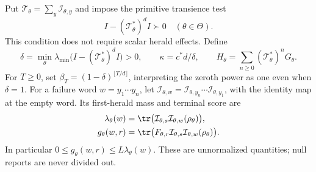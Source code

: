 Put $\mathcal T_\theta=\sum_y\mathcal I_{\theta,y}$ and impose the primitive transience test
\begin{equation}\label{eq:r67-transience}
 I-(\mathcal T_\theta^*)^dI\succ0\quad(\theta\in\Theta).
\end{equation}
This condition does not require scalar herald effects. Define
\[
 \delta=\min_\theta\lambda_{\min}\bigl(I-(\mathcal T_\theta^*)^dI\bigr)>0,
 \qquad \kappa=c^*d/\delta,
 \qquad H_\theta=\sum_{n\ge0}(\mathcal T_\theta^*)^nG_\theta.
\]
For $T\ge0$, set $\beta_T=(1-\delta)^{\lfloor T/d\rfloor}$, interpreting the zeroth power as one even when $\delta=1$. For a failure word $w=y_1\cdots y_n$, let $\mathcal I_{\theta,w}=\mathcal I_{\theta,y_n}\cdots\mathcal I_{\theta,y_1}$, with the identity map at the empty word. Its first-herald mass and terminal score are
\begin{align}
 \lambda_\theta(w)&=\tr\bigl(\mathcal I_{\theta,s}\mathcal I_{\theta,w}(\rho_\theta)\bigr),\label{eq:r67-word}\\
 g_\theta(w,r)&=\tr\bigl(F_{\theta,r}\mathcal I_{\theta,s}\mathcal I_{\theta,w}(\rho_\theta)\bigr).
\end{align}
In particular $0\le g_\theta(w,r)\le L\lambda_\theta(w)$. These are unnormalized quantities; null reports are never divided out.

